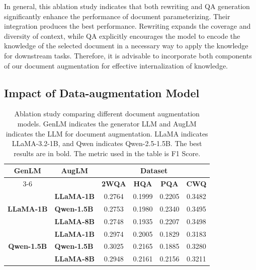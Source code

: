 \documentclass[sigconf,natbib=true,anonymous=false]{acmart}
\begin{document}
In general, this ablation study indicates that both rewriting and QA generation significantly enhance the performance of document parameterizing. Their integration produces the best performance. Rewriting expands the coverage and diversity of context, while QA explicitly encourages the model to encode the knowledge of the selected document in a necessary way to apply the knowledge for downstream tasks. Therefore, it is advisable to incorporate both components of our document augmentation for effective internalization of knowledge.





\subsection{Impact of Data-augmentation Model}
\label{ablation:model}



\label{ablation:self}
\begin{table}
\caption{Ablation study comparing different document augmentation models. GenLM indicates the generator LLM and AugLM indicates the LLM for document augmentation. LLaMA indicates LLaMA-3.2-1B, and Qwen indicates Qwen-2.5-1.5B. The best results are in bold. The metric used in the table is F1 Score.}
\label{table:augLM}
\centering
\begin{tabular}{clcccc}
\toprule
\multirow{2}{*}{\textbf{GenLM }} & \multicolumn{1}{c}{\multirow{2}{*}{\textbf{AugLM }}} & \multicolumn{4}{c}{\textbf{Dataset }}                       \\
\cmidrule(lr){3-6}
                                   & \multicolumn{1}{c}{}                                   & \textbf{2WQA} & \textbf{HQA} & \textbf{PQA} & \textbf{CWQ}  \\
                                   \toprule
\multirow{3}{*}{\textbf{LLaMA-1B}}& \textbf{LLaMA-1B}& 0.2764& 0.1999& 0.2205& 0.3482
\\
                                   & \textbf{Qwen-1.5B}& 0.2753& 0.1980& 0.2340& 0.3495
\\
                                   & \textbf{LLaMA-8B}& 0.2748& 0.1935& 0.2207& 0.3498\\
                                   \toprule
\multirow{3}{*}{\textbf{Qwen-1.5B}}& \textbf{LLaMA-1B}& 0.2974& 0.2005& 0.1829& 
0.3183\\
                                   & \textbf{Qwen-1.5B}& 0.3025& 0.2165& 0.1885& 0.3280\\
                                   & \textbf{LLaMA-8B}& 0.2948& 0.2161& 0.2156& 0.3211\\
                                   \toprule
\end{tabular}
\vspace{-5mm}
\end{table}
\end{document}

